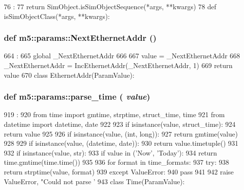 \begin{DoxyCode}
76                                         :
77     return SimObject.isSimObjectSequence(*args, **kwargs)
78 
def isSimObjectClass(*args, **kwargs):
\end{DoxyCode}
\hypertarget{namespacem5_1_1params_acc7cdbc69749307ecd631eef8535ff4b}{
\subsubsection[{NextEthernetAddr}]{\setlength{\rightskip}{0pt plus 5cm}def m5::params::NextEthernetAddr ()}}
\label{namespacem5_1_1params_acc7cdbc69749307ecd631eef8535ff4b}



\begin{DoxyCode}
664                       :
665     global _NextEthernetAddr
666 
667     value = _NextEthernetAddr
668     _NextEthernetAddr = IncEthernetAddr(_NextEthernetAddr, 1)
669     return value
670 
class EthernetAddr(ParamValue):
\end{DoxyCode}
\hypertarget{namespacem5_1_1params_ab8f768c4d90440f33c738a4ca495db06}{
\subsubsection[{parse\_\-time}]{\setlength{\rightskip}{0pt plus 5cm}def m5::params::parse\_\-time ( {\em value})}}
\label{namespacem5_1_1params_ab8f768c4d90440f33c738a4ca495db06}



\begin{DoxyCode}
919                      :
920     from time import gmtime, strptime, struct_time, time
921     from datetime import datetime, date
922 
923     if isinstance(value, struct_time):
924         return value
925 
926     if isinstance(value, (int, long)):
927         return gmtime(value)
928 
929     if isinstance(value, (datetime, date)):
930         return value.timetuple()
931 
932     if isinstance(value, str):
933         if value in ('Now', 'Today'):
934             return time.gmtime(time.time())
935 
936         for format in time_formats:
937             try:
938                 return strptime(value, format)
939             except ValueError:
940                 pass
941 
942     raise ValueError, "Could not parse '%
943 
class Time(ParamValue):
\end{DoxyCode}


